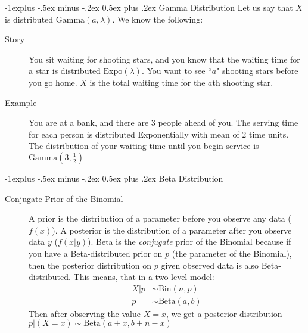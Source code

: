 \documentclass[10pt,landscape]{article}
\makeatletter
\newcommand{\Bin}{\textrm{Bin}}
\newcommand{\Beta}{\textrm{Beta}}
\newcommand{\Gam}{\textrm{Gamma}}
\newcommand{\Expo}{\textrm{Expo}}
\renewcommand{\subsection}{\@startsection{subsection}{2}{0mm}%
                                {-1explus -.5ex minus -.2ex}%
                                {0.5ex plus .2ex}%
                                {\normalfont\normalsize\bfseries}}
\makeatother
\begin{document}
\begin{multicols}{3}
\subsection{Gamma Distribution}
Let us say that $X$ is distributed $\Gam(a, \lambda)$. We know the following:
\begin{description}
    \item[Story] You sit waiting for shooting stars, and you know that the waiting time for a star is distributed $\Expo(\lambda)$. You want to see ``$a$" shooting stars before you go home. $X$ is the total waiting time for the $a$th shooting star.
    \item[Example]  You are at a bank, and there are 3 people ahead of you. The serving time for each person is distributed Exponentially with mean of 2 time units. The distribution of your waiting time until you begin service is $\Gam(3, \frac{1}{2})$

\end{description}

\subsection{Beta Distribution}

\begin{description}

\item[Conjugate Prior of the Binomial] A prior is the distribution of a parameter before you observe any data ($f(x)$). A posterior is the distribution of a parameter after you observe data $y$ ($f(x|y)$). Beta is the \emph{conjugate} prior of the Binomial because if you have a Beta-distributed prior on $p$ (the parameter of the Binomial), then the posterior distribution on $p$ given observed data is also Beta-distributed. This means, that in a two-level model:
    \begin{align*}
        X|p &\sim \Bin(n, p) \\
        p &\sim \Beta(a, b)
    \end{align*}
Then after observing the value $X = x$, we get a posterior distribution $p|(X=x) \sim \Beta(a + x, b + n - x)$


\end{description}
\end{multicols}
\end{document}
